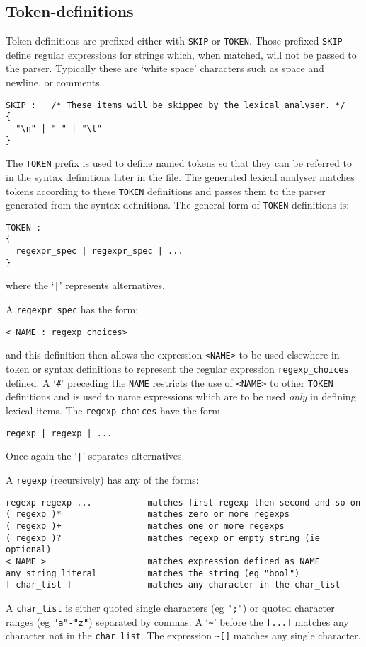 \documentclass{article}
\begin{document}
\subsection*{Token-definitions}

Token definitions are prefixed either with \verb+SKIP+ or \verb+TOKEN+. 
Those prefixed \verb+SKIP+ define regular expressions for
strings which, when matched, will not be passed to the 
parser. Typically these are `white space' characters such
as space and newline, or comments.
\begin{verbatim}
SKIP :   /* These items will be skipped by the lexical analyser. */
{ 
  "\n" | " " | "\t"
}
\end{verbatim}
The \verb+TOKEN+ prefix is used to define named tokens so that they
can be referred to in the syntax definitions later in the
file. The generated lexical analyser matches tokens according to
these \verb+TOKEN+ definitions and passes them to the parser generated from
the syntax definitions. The general form of \verb+TOKEN+ definitions is:
\begin{verbatim}
TOKEN :
{
  regexpr_spec | regexpr_spec | ...
}
\end{verbatim}
where the `\verb+|+' represents alternatives.

A \verb+regexpr_spec+ has the form:
\begin{verbatim}
< NAME : regexp_choices>
\end{verbatim}
and this definition then allows the expression \verb+<NAME>+ to be
used elsewhere in token or syntax definitions to represent the
regular expression \verb+regexp_choices+ defined. 
A `\verb+#+' preceding the \verb+NAME+ restricts the use
of \verb+<NAME>+ to other \verb+TOKEN+ definitions and is
used to name expressions which are to be used
{\em only\/} in defining lexical items.
The \verb+regexp_choices+ have the form
\begin{verbatim}
regexp | regexp | ...
\end{verbatim}
Once again the `\verb+|+' separates alternatives.

A \verb+regexp+ (recursively) has any of the forms:
\begin{verbatim}
regexp regexp ...           matches first regexp then second and so on
( regexp )*                 matches zero or more regexps
( regexp )+                 matches one or more regexps
( regexp )?                 matches regexp or empty string (ie optional)
< NAME >                    matches expression defined as NAME
any string literal          matches the string (eg "bool")
[ char_list ]               matches any character in the char_list
\end{verbatim}
A \verb+char_list+ is either quoted single characters (eg \verb+";"+) or quoted 
character ranges (eg \verb+"a"-"z"+) separated by commas. A `\verb+~+' before
the \verb+[...]+ matches any character not in the \verb+char_list+. 
The expression \verb+~[]+ matches any single character.
\end{document}
